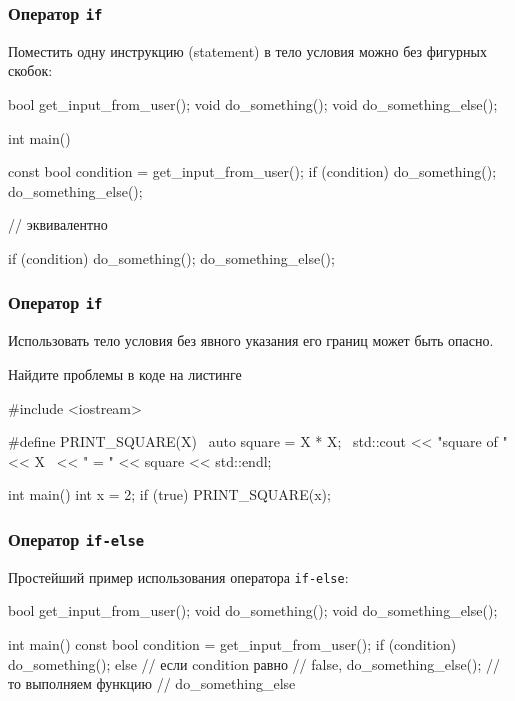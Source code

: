 \documentclass[compress, 8pt, aspectratio=169]{beamer}
\begin{document}
\begin{frame}[fragile]

    \frametitle{Оператор \texttt{if}}

    Поместить одну инструкцию (statement) в тело условия можно
    без фигурных скобок:

    \begin{myinplacelisting}[minted language=cpp]
bool get_input_from_user();
void do_something();
void do_something_else();

int main() {
    const bool condition = get_input_from_user();
    if (condition)
        do_something();
    do_something_else();

    // эквивалентно

    if (condition) {
        do_something();
    }
    do_something_else();
}
    \end{myinplacelisting}

\end{frame}

\begin{frame}[fragile]

    \frametitle{Оператор \texttt{if}}

    Использовать тело условия без явного указания его
    границ может быть опасно.

    \begin{task}
        Найдите проблемы в коде на листинге
    \end{task}

    \begin{myinplacelisting}[minted language=cpp]
#include <iostream>

#define PRINT_SQUARE(X)                 \
    auto square = X * X;                \
    std::cout << "square of " << X      \
        << " = " << square << std::endl;

int main() {
    int x = 2;
    if (true)
        PRINT_SQUARE(x);
}
    \end{myinplacelisting}

\end{frame}

\begin{frame}[fragile]

    \frametitle{Оператор \texttt{if-else}}

    Простейший пример использования оператора \verb|if-else|:

    \begin{myinplacelisting}[minted language=cpp]
bool get_input_from_user();
void do_something();
void do_something_else();

int main() {
    const bool condition = get_input_from_user();
    if (condition) {
        do_something();
    }
    else {                      // если condition равно
                                // false,
        do_something_else();    // то выполняем функцию
                                // do_something_else
    }
}
    \end{myinplacelisting}

\end{frame}
\end{document}
